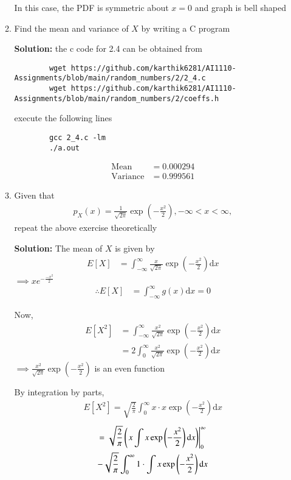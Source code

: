 \documentclass[journal,12pt,twocolumn]{IEEEtran}
\newcommand{\solution}{\noindent \textbf{Solution: }}
\providecommand{\brak}[1]{\ensuremath{\left(#1\right)}}
\providecommand{\mean}[1]{E\left[ #1 \right]}
\providecommand{\der}[1]{\mathrm{d} #1}
\numberwithin{equation}{section}
\renewcommand\thesection{\arabic{section}}
\begin{document}
\begin{enumerate}[label=\thesection.\arabic*,ref=\thesection.\theenumi]
\begin{enumerate}[label=\thesection.\arabic*,ref=\thesection.\theenumi]
	In this case, the PDF is symmetric about $x = 0$ and graph is bell shaped
	
	\item Find the mean and variance of $X$ by writing a C program
	
	\solution the c code for 2.4 can be obtained from
	\begin{lstlisting}
		wget https://github.com/karthik6281/AI1110-Assignments/blob/main/random_numbers/2/2_4.c
		wget https://github.com/karthik6281/AI1110-Assignments/blob/main/random_numbers/2/coeffs.h
	\end{lstlisting}
	execute the following lines
	\begin{lstlisting}
		gcc 2_4.c -lm
		./a.out
	\end{lstlisting}
	\begin{align}
		\text{Mean} &= 0.000294 \\
		\text{Variance} &= 0.999561 
	\end{align}	
	
	\item Given that
	\begin{align}
		p_{X}(x) = \frac{1}{\sqrt{2\pi}}\exp\brak{-\frac{x^2}{2}}, -\infty < x < \infty,
	\end{align}
	repeat the above exercise theoretically
	
	\solution The mean of $X$ is given by
	\begin{align}
		\mean{X} &= \int_{-\infty}^{\infty} \frac{x}{\sqrt{2\pi}}\exp\brak{-\frac{x^2}{2}} \mathrm{d}x 
	\end{align}
	$\implies x e^{-\frac{-x^2}{2}} $
	\begin{align}
		\therefore \mean{X} &= \int_{-\infty}^{\infty} g(x) \mathrm{d}x = 0
	\end{align}
	
	Now, 
	\begin{align}
		\mean{X^2} &= \int_{-\infty}^{\infty} \frac{x^2}{\sqrt{2\pi}}\exp\brak{-\frac{x^2}{2}} \mathrm{d}x \\
		&= 2 \int_{0}^{\infty} \frac{x^2}{\sqrt{2\pi}}\exp\brak{-\frac{x^2}{2}} \mathrm{d}x
	\end{align}
	$\implies \frac{x^2}{\sqrt{2\pi}}\exp\brak{-\frac{x^2}{2}}$ is an even function
	
	By integration by parts,
	\begin{align}
		\mean{X^2} = \sqrt{\frac{2}{\pi}}  \int_{0}^{\infty} x \cdot x \exp\brak{-\frac{x^2}{2}} \der{x} 
	\end{align}
	\begin{multline}
		= \sqrt{\frac{2}{\pi}} \brak{\left. x \int x \exp\brak{-\frac{x^2}{2}} \der{x}}\right|_0^{\infty} \\- \sqrt{\frac{2}{\pi}}  \int_{0}^{\infty} 1 \cdot \int x \exp\brak{-\frac{x^2}{2}} \der{x}
	\end{multline}
	

\end{enumerate}
\end{enumerate}
\end{document}

